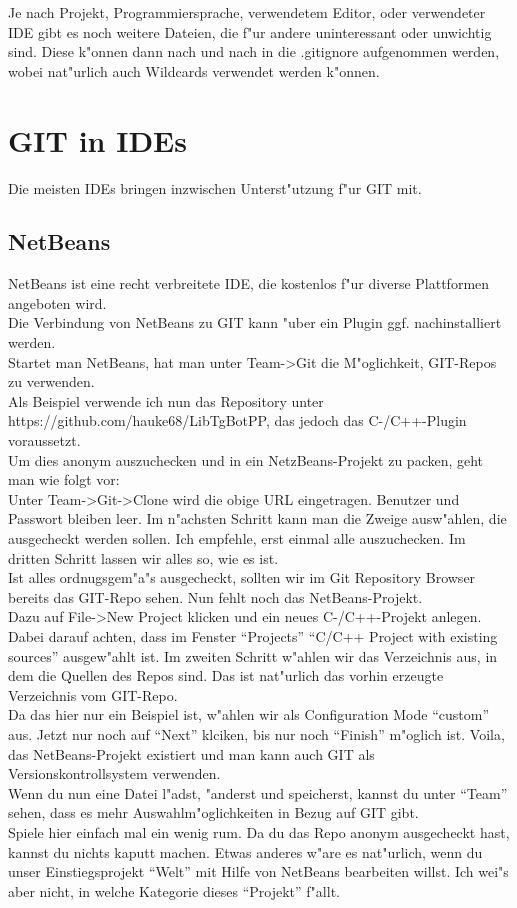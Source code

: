 \documentclass[german,a4paper]{report}
\begin{document}
Je nach Projekt, Programmiersprache, verwendetem Editor, oder 
verwendeter IDE gibt es noch weitere Dateien, die f"ur andere
uninteressant oder unwichtig sind. Diese k"onnen dann nach
und nach in die .gitignore aufgenommen werden, wobei nat"urlich
auch Wildcards verwendet werden k"onnen.

\chapter{GIT in IDEs}
Die meisten IDEs bringen inzwischen Unterst"utzung f"ur GIT mit.\\

\section{NetBeans}
NetBeans ist eine recht verbreitete IDE, die kostenlos f"ur diverse
Plattformen angeboten wird.\\
Die Verbindung von NetBeans zu GIT kann "uber ein Plugin ggf.
nachinstalliert werden.\\
Startet man NetBeans, hat man unter Team->Git die M"oglichkeit,
GIT-Repos zu verwenden.\\
Als Beispiel verwende ich nun das Repository unter
https://github.com/hauke68/LibTgBotPP, das jedoch das C-/C++-Plugin
voraussetzt.\\
Um dies anonym auszuchecken und in ein NetzBeans-Projekt zu packen,
geht man wie folgt vor:\\
Unter Team->Git->Clone wird die obige URL eingetragen. Benutzer
und Passwort bleiben leer. Im n"achsten Schritt kann man die
Zweige ausw"ahlen, die ausgecheckt werden sollen. Ich empfehle,
erst einmal alle auszuchecken. Im dritten Schritt lassen wir alles
so, wie es ist.\\
Ist alles ordnugsgem"a"s ausgecheckt, sollten wir im Git Repository
Browser bereits das GIT-Repo sehen. Nun fehlt noch das NetBeans-Projekt.\\
Dazu auf File->New Project klicken und ein neues C-/C++-Projekt anlegen.
Dabei darauf achten, dass im Fenster ``Projects'' ``C/C++ Project with
existing sources'' ausgew"ahlt ist. Im zweiten Schritt w"ahlen wir
das Verzeichnis aus, in dem die Quellen des Repos sind. Das ist nat"urlich
das vorhin erzeugte Verzeichnis vom GIT-Repo.\\
Da das hier nur ein Beispiel ist, w"ahlen wir als Configuration Mode
``custom'' aus. Jetzt nur noch auf ``Next'' klciken, bis nur noch
``Finish'' m"oglich ist. Voila, das NetBeans-Projekt existiert und
man kann auch GIT als Versionskontrollsystem verwenden.\\
Wenn du nun eine Datei l"adst, "anderst und speicherst, kannst du
unter ``Team'' sehen, dass es mehr Auswahlm"oglichkeiten in Bezug
auf GIT gibt.\\
Spiele hier einfach mal ein wenig rum. Da du das Repo anonym
ausgecheckt hast, kannst du nichts kaputt machen. Etwas anderes
w"are es nat"urlich, wenn du unser Einstiegsprojekt ``Welt'' mit
Hilfe von NetBeans bearbeiten willst. Ich wei"s aber nicht, in
welche Kategorie dieses ``Projekt'' f"allt.
\end{document}
